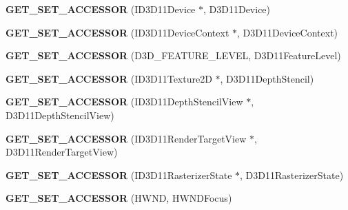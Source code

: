 \begin{DoxyCompactItemize}
\item 
\hypertarget{class_d_x_u_t_state_aeccc2a25d476f95f2e9569e861c7d54d}{{\bfseries G\+E\+T\+\_\+\+S\+E\+T\+\_\+\+A\+C\+C\+E\+S\+S\+O\+R} (I\+D3\+D11\+Device $\ast$, D3\+D11\+Device)}\label{class_d_x_u_t_state_aeccc2a25d476f95f2e9569e861c7d54d}

\item 
\hypertarget{class_d_x_u_t_state_aaeca11be85150a138c4c9fc72cb4bde8}{{\bfseries G\+E\+T\+\_\+\+S\+E\+T\+\_\+\+A\+C\+C\+E\+S\+S\+O\+R} (I\+D3\+D11\+Device\+Context $\ast$, D3\+D11\+Device\+Context)}\label{class_d_x_u_t_state_aaeca11be85150a138c4c9fc72cb4bde8}

\item 
\hypertarget{class_d_x_u_t_state_af203c3e93271ce3a9a94fcfdf3ce1f73}{{\bfseries G\+E\+T\+\_\+\+S\+E\+T\+\_\+\+A\+C\+C\+E\+S\+S\+O\+R} (D3\+D\+\_\+\+F\+E\+A\+T\+U\+R\+E\+\_\+\+L\+E\+V\+E\+L, D3\+D11\+Feature\+Level)}\label{class_d_x_u_t_state_af203c3e93271ce3a9a94fcfdf3ce1f73}

\item 
\hypertarget{class_d_x_u_t_state_ac59b899ad4806c7a1bead09c301aa82c}{{\bfseries G\+E\+T\+\_\+\+S\+E\+T\+\_\+\+A\+C\+C\+E\+S\+S\+O\+R} (I\+D3\+D11\+Texture2\+D $\ast$, D3\+D11\+Depth\+Stencil)}\label{class_d_x_u_t_state_ac59b899ad4806c7a1bead09c301aa82c}

\item 
\hypertarget{class_d_x_u_t_state_a7802aec9ea6599d6ecc4226c5d17054a}{{\bfseries G\+E\+T\+\_\+\+S\+E\+T\+\_\+\+A\+C\+C\+E\+S\+S\+O\+R} (I\+D3\+D11\+Depth\+Stencil\+View $\ast$, D3\+D11\+Depth\+Stencil\+View)}\label{class_d_x_u_t_state_a7802aec9ea6599d6ecc4226c5d17054a}

\item 
\hypertarget{class_d_x_u_t_state_ac11e92370db48b2da7f756792fe2cee0}{{\bfseries G\+E\+T\+\_\+\+S\+E\+T\+\_\+\+A\+C\+C\+E\+S\+S\+O\+R} (I\+D3\+D11\+Render\+Target\+View $\ast$, D3\+D11\+Render\+Target\+View)}\label{class_d_x_u_t_state_ac11e92370db48b2da7f756792fe2cee0}

\item 
\hypertarget{class_d_x_u_t_state_ac7f6b89f94fccccf10e1177a629aac62}{{\bfseries G\+E\+T\+\_\+\+S\+E\+T\+\_\+\+A\+C\+C\+E\+S\+S\+O\+R} (I\+D3\+D11\+Rasterizer\+State $\ast$, D3\+D11\+Rasterizer\+State)}\label{class_d_x_u_t_state_ac7f6b89f94fccccf10e1177a629aac62}

\item 
\hypertarget{class_d_x_u_t_state_a9cfa587aab5d6f88711e558ae4d5f6b1}{{\bfseries G\+E\+T\+\_\+\+S\+E\+T\+\_\+\+A\+C\+C\+E\+S\+S\+O\+R} (H\+W\+N\+D, H\+W\+N\+D\+Focus)}\label{class_d_x_u_t_state_a9cfa587aab5d6f88711e558ae4d5f6b1}


\end{DoxyCompactItemize}
